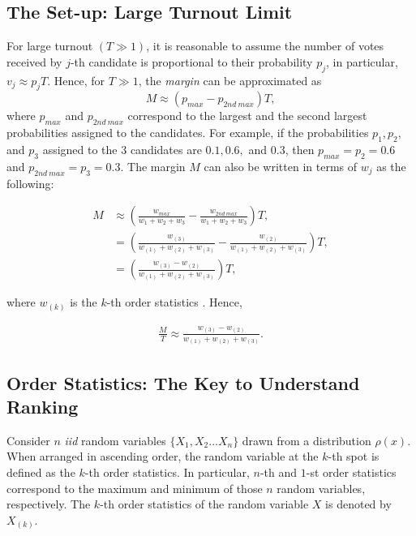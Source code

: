 \subsection{The Set-up: Large Turnout Limit}
For large turnout $(T \gg 1)$, it is reasonable to assume the number of votes received by $j$-th candidate is proportional to their probability $p_j$, in particular, $v_j \approx p_j T$. Hence, for $T \gg 1$, the \emph{margin} can be approximated as 
\begin{equation}
M \approx (p_{max} - p_{2nd \: max})T,
\end{equation}
where $p_{max}$ and $p_{2nd \:max}$ correspond to the largest and the second largest probabilities assigned to the candidates. For example, if the probabilities $p_1, p_2,$ and $p_3$ assigned to the 3 candidates are $0.1, 0.6,$ and $0.3$, then $p_{max} = p_2 = 0.6$ and $p_{2nd \:max} = p_3 = 0.3$. The margin $M$ can also be written in terms of $w_j$ as the following:
\begin{center}
\begin{align}
    \nonumber M &\approx \left(\frac{w_{max}}{w_1 + w_2 + w_3} - \frac{w_{2nd\:max}}{w_1 + w_2 + w_3}\right)T,\\
    \nonumber & = \left(\frac{w_{(3)}}{w_{(1)} + w_{(2)} + w_{(3)}} - \frac{w_{(2)}}{w_{(1)} + w_{(2)} + w_{(3)}}\right)T,\\
    & = \left(\frac{w_{(3)} - w_{(2)}}{w_{(1)} + w_{(2)} + w_{(3)}}\right)T,
\end{align}

\end{center}
where $w_{(k)}$ is the $k$-th order statistics \cite{BarBalNag2008}. Hence, 
\begin{center}
\begin{align}
    \frac{M}{T} \approx \frac{w_{(3)} - w_{(2)}}{w_{(1)} + w_{(2)} + w_{(3)}}.
    \label{eq:S6}
\end{align}
\end{center}
\subsection{Order Statistics: The Key to Understand Ranking}
Consider $n$ \emph{iid} random variables $\{X_1, X_2 \dots X_n\}$ drawn from a distribution $\rho(x)$. When arranged in ascending order, the random variable at the $k$-th spot is defined as the $k$-th order statistics. In particular, $n$-th and $1$-st order statistics correspond to the maximum and minimum of those $n$ random variables, respectively. The $k$-th order statistics of the random variable $X$ is denoted by $X_{(k)}$.

